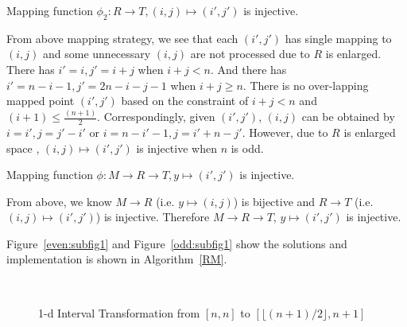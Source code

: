 \documentclass[AMA,LATO1COL]{WileyNJD-v2}
\begin{document}
\vspace{5mm}
\begin{lemma}
Mapping function $\phi_2:   R \rightarrow  T, (i,j) \mapsto (i',j')$ is injective.
\end{lemma}
From above mapping strategy, we see that each $(i',j')$ has single mapping to $(i,j)$ and some unnecessary $(i,j)$ are not processed due to $R$ is enlarged. There has $i'=i, j'=i+j$ when $i+j<n$. And there has $i'=n-i-1, j'=2n-i-j-1$ when $i+j\geq n$. There is no over-lapping mapped point $(i',j')$ based on the constraint of $i+j<n$ and  $(i+1) \leq \frac{(n+1)}{2}$. Correspondingly, given $(i',j')$, $(i,j)$ can be obtained by $i=i', j=j'-i'$ or $i=n-i'-1, j=i'+n-j'$. However, due to $R$ is enlarged space , $(i,j) \mapsto (i',j')$ is injective when $n$ is odd.
\vspace{5mm}
\begin{corollary}
Mapping function $\phi:   M \rightarrow R \rightarrow  T,y \mapsto (i',j')$ is injective.
\end{corollary}
From above, we know $M  \rightarrow R$ (i.e. $y \mapsto (i,j)$) is bijective and $R \rightarrow  T$ (i.e. $(i,j) \mapsto (i',j')$) is injective. Therefore $ M  \rightarrow R \rightarrow  T$,  $y \mapsto (i',j')$ is injective.

Figure~\ref{even:subfig1} and Figure~\ref{odd:subfig1} show the solutions and implementation is shown in Algorithm~\ref{RM}.

\begin{figure}[h]
\centering
{}
~~
\caption{1-d Interval Transformation from $[n,n]$ to $[\lfloor (n+1)/2 \rfloor,n+1]$}\label{modelBF}
\end{figure}
\end{document}
